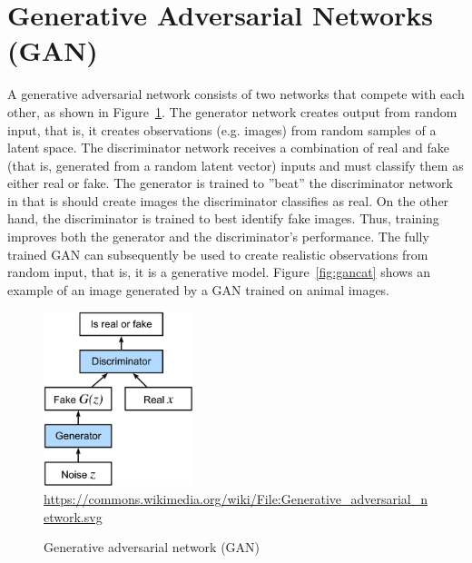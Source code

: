 \FloatBarrier

\section{Generative Adversarial Networks (GAN)}

A generative adversarial network consists of two networks that compete with each other, as shown in Figure~\ref{fig:gan}. The generator network creates output from random input, that is, it creates observations (e.g. images) from random samples of a latent space. The discriminator network receives a combination of real and fake (that is, generated from a random latent vector) inputs and must classify them as either real or fake. The generator is trained to ''beat'' the discriminator network in that is should create images the discriminator classifies as real. On the other hand, the discriminator is trained to best identify fake images. Thus, training improves both the generator and the discriminator's performance. The fully trained GAN can subsequently be used to create realistic observations from random input, that is, it is a generative model. Figure~\ref{fig:gancat} shows an example of an image generated by a GAN trained on animal images.

\begin{figure}
\begin{center}
\includegraphics[height=2in]{Generative_adversarial_network.svg.png}\\

\scriptsize \url{https://commons.wikimedia.org/wiki/File:Generative_adversarial_network.svg} \normalsize
\end{center}
\caption{Generative adversarial network (GAN)}
\label{fig:gan}
\end{figure}

